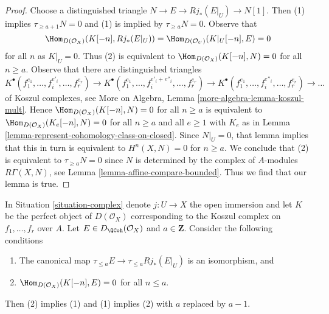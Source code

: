 \begin{proof}
Choose a distinguished triangle $N \to E \to Rj_*(E|_U) \to N[1]$.
Then (1) implies $\tau_{\geq a + 1} N = 0$ and (1) is implied by
$\tau_{\geq a}N = 0$. Observe that
$$
\Hom_{D(\mathcal{O}_X)}(K[-n], Rj_*(E|_U)) =
\Hom_{D(\mathcal{O}_U)}(K|_U[-n], E) = 0
$$
for all $n$ as $K|_U = 0$. Thus (2) is equivalent to
$\Hom_{D(\mathcal{O}_X)}(K[-n], N) = 0$ for all $n \geq a$. 
Observe that there are distinguished triangles
$$
K^\bullet(f_1^{e_1}, \ldots, f_i^{e'_i}, \ldots, f_r^{e_r}) \to
K^\bullet(f_1^{e_1}, \ldots, f_i^{e'_i + e''_i}, \ldots, f_r^{e_r}) \to
K^\bullet(f_1^{e_1}, \ldots, f_i^{e''_i}, \ldots, f_r^{e_r}) \to \ldots
$$
of Koszul complexes, see
More on Algebra, Lemma \ref{more-algebra-lemma-koszul-mult}. Hence
$\Hom_{D(\mathcal{O}_X)}(K[-n], N) = 0$ for all $n \geq a$
is equivalent to
$\Hom_{D(\mathcal{O}_X)}(K_e[-n], N) = 0$ for all $n \geq a$ and
all $e \geq 1$ with $K_e$ as in
Lemma \ref{lemma-represent-cohomology-class-on-closed}.
Since $N|_U = 0$, that lemma implies that this in turn is equivalent to
$H^n(X, N) = 0$ for $n \geq a$. We conclude that (2) is equivalent
to $\tau_{\geq a}N = 0$ since $N$ is determined by the complex of
$A$-modules $R\Gamma(X, N)$, see Lemma \ref{lemma-affine-compare-bounded}.
Thus we find that our lemma is true.
\end{proof}

\begin{lemma}
\label{lemma-orthogonal-koszul-second-variant}
In Situation \ref{situation-complex} denote $j : U \to X$ the open
immersion and let $K$ be the perfect object of $D(\mathcal{O}_X)$
corresponding to the Koszul complex on $f_1, \ldots, f_r$ over $A$.
Let $E \in D_\QCoh(\mathcal{O}_X)$ and $a \in \mathbf{Z}$. Consider
the following conditions
\begin{enumerate}
\item The canonical map $\tau_{\leq a}E \to \tau_{\leq a} Rj_*(E|_U)$
is an isomorphism, and
\item $\Hom_{D(\mathcal{O}_X)}(K[-n], E) = 0$ for all $n \leq a$.
\end{enumerate}
Then (2) implies (1) and (1) implies (2) with $a$ replaced by $a - 1$.
\end{lemma}

